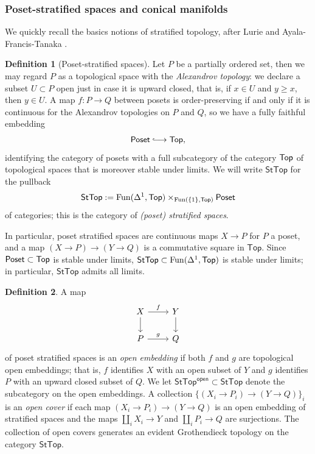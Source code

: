 \documentclass[10pt, reqno, twoside
, final
]{amsart}
\numberwithin{equation}{subsection}%
\theoremstyle{definition}
\newtheorem{defn}{Definition}[subsection]
\theoremstyle{definition}
\theoremstyle{definition}
\theoremstyle{definition}
\theoremstyle{definition}
\theoremstyle{definition}
\theoremstyle{definition}
\theoremstyle{definition}
\theoremstyle{definition}
\theoremstyle{plain}
\theoremstyle{definition}
\theoremstyle{plain}
\theoremstyle{definition}
\theoremstyle{plain}
\theoremstyle{definition}
\theoremstyle{definition}
\theoremstyle{plain}
\theoremstyle{plain}
\theoremstyle{definition}
\theoremstyle{plain}
\theoremstyle{plain}
\theoremstyle{plain}
\begin{document}
\subsubsection{Poset-stratified spaces and conical manifolds}
We quickly recall the basics notions of stratified topology, after Lurie \cite[Appendix B]{LurHA} and Ayala-Francis-Tanaka \cite{AFT-local-structures}. 
\begin{defn}[Poset-stratified spaces]
Let $P$ be a partially ordered set, then we may regard $P$ as a topological space with the \emph{Alexandrov topology}: we declare a subset $U\subset P$ open just in case it is upward closed, that is, if $x\in U$ and $y\geq x$, then $y\in U$. A map $f:P\rightarrow Q$ between posets is order-preserving if and only if it is continuous for the Alexandrov topologies on $P$ and $Q$, so we have a fully faithful embedding
\[  \mathsf{Poset}\hooklongrightarrow \topo, \]
identifying the category of posets with a full subcategory of the category $\mathsf{Top}$ of topological spaces that is moreover stable under limits. We will write $\mathsf{StTop}$ for the pullback
\[  \mathsf{StTop} := \mathrm{Fun}(\Delta^1,\mathsf{Top})\times_{\mathrm{Fun}(\{1\},\mathsf{Top})}\mathsf{Poset} \]
of categories; this is the category of \emph{(poset) stratified spaces}. 
\end{defn}
In particular, poset stratified spaces are continuous maps $X\rightarrow P$ for $P$ a poset, and a map $(X\rightarrow P)\rightarrow (Y\rightarrow Q)$ is a commutative square in $\mathsf{Top}$. Since $\mathsf{Poset}\subset \mathsf{Top}$ is stable under limits, $\mathsf{StTop}\subset \mathrm{Fun}(\Delta^1,\mathsf{Top})$ is stable under limits; in particular, $\mathsf{StTop}$ admits all limits. 
\begin{defn}\label{defn:openemb}
A map
\[
\begin{tikzcd}
X \ar[d] \ar[r,"f"] & Y\ar[d] \\
P \ar[r,"g"] & Q
\end{tikzcd}
\]
of poset stratified spaces is an \emph{open embedding} if both $f$ and $g$ are topological open embeddings; that is, $f$ identifies $X$ with an open subset of $Y$ and $g$ identifies $P$ with an upward closed subset of $Q$. We let $\mathsf{StTop}^{\mathsf{open}}\subset \mathsf{StTop}$ denote the subcategory on the open embeddings. A collection $\{(X_i\rightarrow P_i)\rightarrow (Y\rightarrow Q)\}_i$ is an \emph{open cover} if each map $(X_i\rightarrow P_i)\rightarrow (Y\rightarrow Q)$ is an open embedding of stratified spaces and the maps $\coprod_iX_i\rightarrow Y$ and $\coprod_i P_i\rightarrow Q$ are surjections. The collection of open covers generates an evident Grothendieck topology on the category $\mathsf{StTop}$.
\end{defn}
\end{document}
